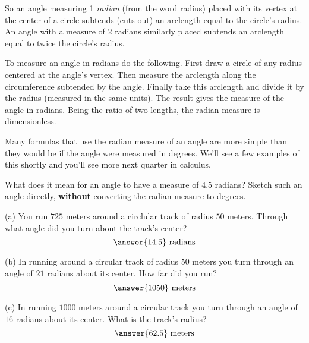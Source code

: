 \documentclass{ximera}
\begin{document}
So an angle measuring 1 \emph{radian} (from the word radius) placed with its vertex at the center of a circle subtends (cuts out) an arclength equal to the circle's radius. An angle with a measure of 2 radians similarly placed subtends an arclength equal to twice the circle's radius. 

To measure an angle in radians do the following. First draw a circle of any radius centered at the angle's vertex. Then measure the arclength along the circumference subtended by the angle. Finally take this arclength and divide it by the radius (measured in the same units). The result gives the measure of the angle in radians. Being the ratio of two lengths, the radian measure is dimensionless.

Many formulas that use the radian measure of an angle are more simple than they would be if the angle were measured in degrees. We'll see a few examples of this shortly and you'll see more next quarter in calculus.


\begin{question} \label{Q1:Radians}
What does it mean for an angle to have a measure of $4.5$ radians? Sketch such an angle directly, {\bf without} converting the radian measure to degrees.
\begin{freeResponse}
\end{freeResponse}
\end{question}


\begin{question} \label{Q01:Radians}
(a) You run $725$ meters around a circlular track of radius $50$ meters. Through what angle did you turn about the track's center?
\[
    \answer{14.5} \text{ radians}
\]

(b) In running around a circular track of radius $50$ meters you turn through an angle of $21$ radians about its center. How far did you run?
\[
    \answer{1050} \text{ meters}
\]

(c) In running $1000$ meters around a circular track you turn through an angle of $16$ radians about its center. What is the track's radius?
\[
   \answer{62.5} \text{ meters}
\]

\end{question}
\end{document}
